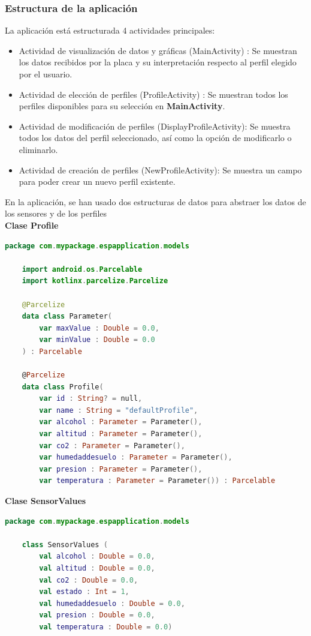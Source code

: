 \documentclass[../main]{subfiles}
\begin{document}
\subsubsection{Estructura de la aplicación}
La aplicación está estructurada 4 actividades principales:
\begin{itemize}
	\item Actividad de visualización de datos y gráficas (MainActivity) : Se muestran los datos recibidos por la placa y su interpretación respecto al perfil elegido por el usuario.
	\item Actividad de elección de perfiles (ProfileActivity) : Se muestran todos los perfiles disponibles para su selección en \textbf{MainActivity}.
	\item Actividad de modificación de perfiles (DisplayProfileActivity): Se muestra todos los datos del perfil seleccionado, así como la opción de modificarlo o eliminarlo.
	\item Actividad de creación de perfiles (NewProfileActivity): Se muestra un campo para poder crear un nuevo perfil existente.
\end{itemize}
En la aplicación, se han usado dos estructuras de datos para abstraer los datos de los sensores y de los perfiles\\
\textbf{Clase Profile}
\begin{lstlisting}[language = Kotlin]
	package com.mypackage.espapplication.models

	import android.os.Parcelable
	import kotlinx.parcelize.Parcelize

	@Parcelize
	data class Parameter(
    	var maxValue : Double = 0.0,
    	var minValue : Double = 0.0
	) : Parcelable

	@Parcelize
	data class Profile(
		var id : String? = null,
		var name : String = "defaultProfile",
		var alcohol : Parameter = Parameter(),
		var altitud : Parameter = Parameter(),
		var co2 : Parameter = Parameter(),
		var humedaddesuelo : Parameter = Parameter(),
		var presion : Parameter = Parameter(),
		var temperatura : Parameter = Parameter()) : Parcelable
\end{lstlisting}
\textbf{Clase SensorValues}
\begin{lstlisting}[language=Kotlin]
	package com.mypackage.espapplication.models

	class SensorValues (
		val alcohol : Double = 0.0,
		val altitud : Double = 0.0,
		val co2 : Double = 0.0,
		val estado : Int = 1,
		val humedaddesuelo : Double = 0.0,
		val presion : Double = 0.0,
		val temperatura : Double = 0.0)
\end{lstlisting}
\end{document}
